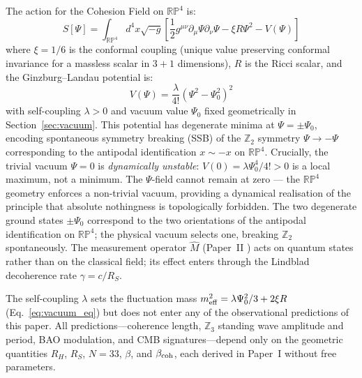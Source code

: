 \begin{proposition}
The action for the Cohesion Field on $\mathbb{RP}^4$ is:
\begin{equation}
S[\Psi] = \int_{\mathbb{RP}^4} d^4x \sqrt{-g} \left[
  \frac{1}{2}g^{\mu\nu}\partial_\mu\Psi\partial_\nu\Psi
  - \xi R\Psi^2 - V(\Psi)
\right]
\label{eq:action}
\end{equation}
where $\xi = 1/6$ is the conformal coupling (unique value preserving conformal invariance for a massless scalar in $3+1$ dimensions), $R$ is the Ricci scalar, and the Ginzburg--Landau potential is:
\begin{equation}
V(\Psi) = \frac{\lambda}{4!}\!\left(\Psi^2 - \Psi_0^2\right)^2
\label{eq:potential}
\end{equation}
with self-coupling $\lambda > 0$ and vacuum value $\Psi_0$ fixed geometrically in Section~\ref{sec:vacuum}. This potential has degenerate minima at $\Psi = \pm\Psi_0$, encoding spontaneous symmetry breaking (SSB) of the $\mathbb{Z}_2$ symmetry $\Psi \to -\Psi$ corresponding to the antipodal identification $x \sim -x$ on $\mathbb{RP}^4$. Crucially, the trivial vacuum $\Psi = 0$ is \emph{dynamically unstable}: $V(0) = \lambda\Psi_0^4/4! > 0$ is a local maximum, not a minimum. The $\Psi$-field cannot remain at zero — the $\mathbb{RP}^4$ geometry enforces a non-trivial vacuum, providing a dynamical realisation of the principle that absolute nothingness is topologically forbidden. The two degenerate ground states $\pm\Psi_0$ correspond to the two orientations of the antipodal identification on $\mathbb{RP}^4$; the physical vacuum selects one, breaking $\mathbb{Z}_2$ spontaneously. The measurement operator $\hat{M}$ (Paper~II \citep{Peacock2026b_qm}) acts on quantum states rather than on the classical field; its effect enters through the Lindblad decoherence rate $\gamma = c/R_S$.

\begin{remark}
The self-coupling $\lambda$ sets the fluctuation mass $m_{\rm eff}^2 = \lambda\Psi_0^2/3 + 2\xi R$ (Eq.~\ref{eq:vacuum_eq}) but does not enter any of the observational predictions of this paper. All predictions---coherence length, $\mathbb{Z}_3$ standing wave amplitude and period, BAO modulation, and CMB signatures---depend only on the geometric quantities $R_H$, $R_S$, $N = 33$, $\beta$, and $\beta_{\rm coh}$, each derived in Paper~I \citep{Peacock2026a} without free parameters.
\end{remark}
\end{proposition}

